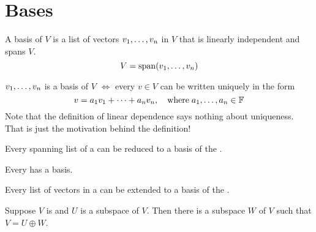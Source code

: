 \section{Bases}


\setcounter{thm}{25}
\begin{mydef}
  A basis of $V$ is a list of vectors $v_1, \dots, v_n$ in $V$ that is linearly independent and spans $V$.
  \begin{equation}
    V= \operatorname{span} (v_1, \dots, v_n)
  \end{equation}
\end{mydef}


\setcounter{thm}{27}
\begin{thm}
  $v_1, \dots, v_n$ is a basis of $V$ $\iff$ every $v \in V$ can be written uniquely in the form
  \begin{equation}
    v=a_1 v_1 + \dots + a_n v_n, \quad \text{where} \; a_1, \dots, a_n \in \mathbb{F}
  \end{equation}
  Note that the definition of linear dependence says nothing about uniqueness. That is just the motivation behind the definition!
\end{thm}

\setcounter{thm}{29}
\begin{thm} Every spanning list of a \vs can be reduced to a basis of the \vs.
\end{thm}

\setcounter{thm}{30}
\begin{thm} Every \findimvs has a basis.\end{thm}

\begin{thm} Every \lid list of vectors in a  \findimvs can be extended to a basis of the \vs. \end{thm}

\begin{thm} Suppose $V$ is \fd and $U$ is a subspace of $V$. Then there is a subspace $W$ of $V$ such that $V=U \oplus W$. \end{thm}

